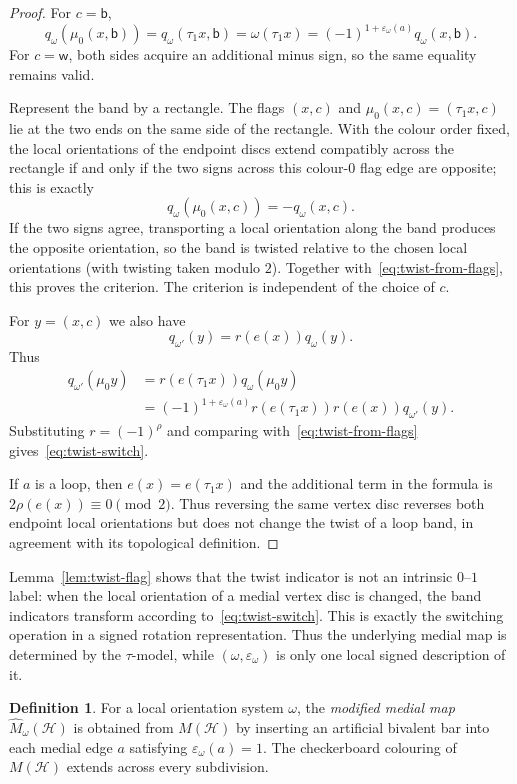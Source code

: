 \documentclass{article}
\theoremstyle{definition}
\newtheorem{definition}[theorem]{Definition}
\theoremstyle{remark}
\newcommand{\Hcal}{\mathcal{H}}
\begin{document}
\begin{proof}
For $c=\mathsf b$,
\[
 q_\omega(\mu_0(x,\mathsf b))
 =q_\omega(\tau_1x,\mathsf b)
 =\omega(\tau_1x)
 =(-1)^{1+\varepsilon_\omega(a)}q_\omega(x,\mathsf b).
\]
For $c=\mathsf w$, both sides acquire an additional minus sign, so the same equality remains valid.

Represent the band by a rectangle. The flags $(x,c)$ and $\mu_0(x,c)=(\tau_1x,c)$ lie at the two ends on the same side of the rectangle. With the colour order fixed, the local orientations of the endpoint discs extend compatibly across the rectangle if and only if the two signs across this colour-$0$ flag edge are opposite; this is exactly
\[
  q_\omega(\mu_0(x,c))=-q_\omega(x,c).
\]
If the two signs agree, transporting a local orientation along the band produces the opposite orientation, so the band is twisted relative to the chosen local orientations (with twisting taken modulo $2$). Together with~\eqref{eq:twist-from-flags}, this proves the criterion. The criterion is independent of the choice of $c$.

For $y=(x,c)$ we also have
\[
 q_{\omega'}(y)=r(e(x))q_\omega(y).
\]
Thus
\[
\begin{aligned}
 q_{\omega'}(\mu_0y)
 &=r(e(\tau_1x))q_\omega(\mu_0y)\\
 &=(-1)^{1+\varepsilon_\omega(a)}
   r(e(\tau_1x))r(e(x))q_{\omega'}(y).
\end{aligned}
\]
Substituting $r=(-1)^\rho$ and comparing with~\eqref{eq:twist-from-flags} gives~\eqref{eq:twist-switch}.

If $a$ is a loop, then $e(x)=e(\tau_1x)$ and the additional term in the formula is $2\rho(e(x))\equiv0\pmod2$. Thus reversing the same vertex disc reverses both endpoint local orientations but does not change the twist of a loop band, in agreement with its topological definition.
\end{proof}

Lemma~\ref{lem:twist-flag} shows that the twist indicator is not an intrinsic $0$--$1$ label: when the local orientation of a medial vertex disc is changed, the band indicators transform according to~\eqref{eq:twist-switch}. This is exactly the switching operation in a signed rotation representation. Thus the underlying medial map is determined by the $\tau$-model, while $(\omega,\varepsilon_\omega)$ is only one local signed description of it.

\begin{definition}\label{def:modified-medial}
For a local orientation system $\omega$, the \emph{modified medial map} $\widehat M_\omega(\Hcal)$ is obtained from $M(\Hcal)$ by inserting an artificial bivalent bar into each medial edge $a$ satisfying $\varepsilon_\omega(a)=1$. The checkerboard colouring of $M(\Hcal)$ extends across every subdivision.
\end{definition}
\end{document}

